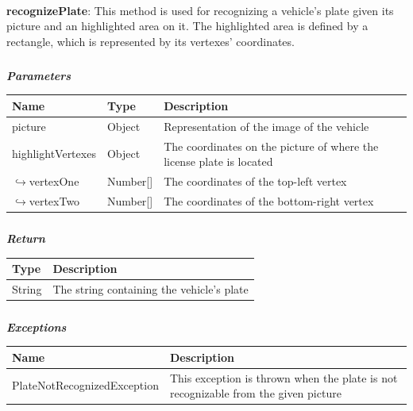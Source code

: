 					\paragraph{}
							\textbf{recognizePlate}: This method is used for recognizing a vehicle's plate given its picture and an highlighted area on it. The highlighted area is defined by a rectangle, which is represented by its vertexes' coordinates. 
							\subparagraph{}
							\vspace{-3mm}
							\textcolor{myBlue}{\textit{\textbf{Parameters}}}
							\vspace{-2mm}
								\begin{table}[!h]
									\begin{tabular}{L{0.3\textwidth}L{0.15\textwidth}L{0.43\textwidth}}
										\toprule
										\textbf{Name} & \textbf{Type} & \textbf{Description} \\
										\midrule
								  		picture & Object & Representation of the image of the vehicle \\
								  		highlightVertexes & Object & The coordinates on the picture of where the license plate is located \\
								  		\hspace{2.5mm}$\hookrightarrow$vertexOne & Number[] & The coordinates of the \newline top-left vertex \\
								  		\hspace{2.5mm}$\hookrightarrow$vertexTwo & Number[] & The coordinates of the \newline bottom-right vertex \\
								 		\bottomrule
									\end{tabular}
								\end{table}
							\subparagraph{}
							\vspace{-4mm}
								\textcolor{myGreen}{\textit{\textbf{Return}}}
								\vspace{-2mm}
									\begin{table}[!h]
									\begin{tabular}{L{0.15\textwidth}L{0.73\textwidth}}
										\toprule
										\textbf{Type} & \textbf{Description} \\
										\midrule
								  		String & The string containing the vehicle's plate \\
								 		\bottomrule
									\end{tabular}
								\end{table}
							\subparagraph{}
								\vspace{-5mm}
								\textcolor{myRed}{\textit{\textbf{Exceptions}}}
								\vspace{-2mm}
									\begin{table}[!h]
									\begin{tabular}{L{0.4\textwidth}L{0.52\textwidth}}
										\toprule
										\textbf{Name} & \textbf{Description} \\
										\midrule
								  		PlateNotRecognizedException & This exception is thrown when the plate is not recognizable from the given picture \\
								 		\bottomrule
									\end{tabular}
								\end{table}		
